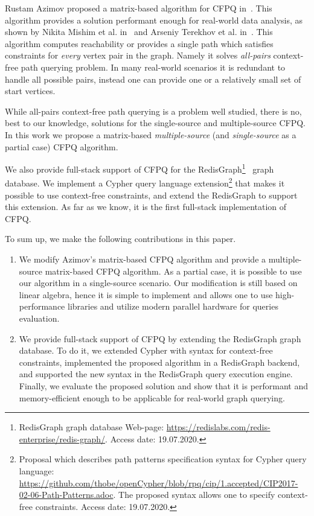 Rustam Azimov proposed a matrix-based algorithm for CFPQ in~\cite{Azimov:2018:CPQ:3210259.3210264}.
This algorithm provides a solution performant enough for real-world data analysis, as shown by Nikita Mishim et al. in~\cite{Mishin:2019:ECP:3327964.3328503} and Arseniy Terekhov et al. in~\cite{10.1145/3398682.3399163}.
This algorithm computes reachability or provides a single path which satisfies constraints for \emph{every} vertex pair in the graph.
Namely it solves \emph{all-pairs} context-free path querying problem.
In many real-world scenarios it is redundant to handle all possible pairs, instead one can provide one or a relatively small set of start vertices.

While all-pairs context-free path querying is a problem well studied, there is no, best to our knowledge, solutions for the single-source and multiple-source CFPQ.
In this work we propose a matrix-based \textit{multiple-source} (and \textit{single-source} as a partial case) CFPQ algorithm.

We also provide full-stack support of CFPQ for the RedisGraph\footnote{RedisGraph graph database Web-page: \url{https://redislabs.com/redis-enterprise/redis-graph/}. Access date: 19.07.2020.}~\cite{8778293} graph database.
We implement a Cypher query language extension\footnote{Proposal which describes path patterns specification syntax for Cypher query language: \url{https://github.com/thobe/openCypher/blob/rpq/cip/1.accepted/CIP2017-02-06-Path-Patterns.adoc}.
The proposed syntax allows one to specify context-free constraints. Access date: 19.07.2020.} that makes it possible to use context-free constraints, and extend the RedisGraph to support this extension.
As far as we know, it is the first full-stack implementation of CFPQ.

To sum up, we make the following contributions in this paper.
\begin{enumerate}
	\item We modify Azimov's matrix-based CFPQ algorithm and provide a multiple-source matrix-based CFPQ algorithm.
	As a partial case, it is possible to use our algorithm in a single-source scenario.
	Our modification is still based on linear algebra, hence it is simple to implement and allows one to use high-performance libraries and utilize modern parallel hardware for queries evaluation.
	\item We provide full-stack support of CFPQ by extending the RedisGraph graph database.
	To do it, we extended Cypher with syntax for context-free constraints, implemented the proposed algorithm in a RedisGraph backend, and supported the new syntax in the RedisGraph query execution engine.
	Finally, we evaluate the proposed solution and show that it is performant and memory-efficient enough to be applicable for real-world graph querying.
\end{enumerate}